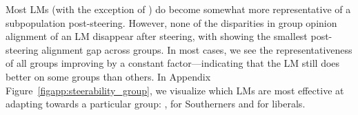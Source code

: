 Most LMs (with the exception of ) do become somewhat more representative of a subpopulation post-steering.
However, none of the disparities in group opinion alignment of an LM disappear after steering, with  showing the smallest post-steering alignment gap across groups. In most cases, we see the representativeness of all groups improving by a constant factor---indicating that the LM still does better on some groups than others.
In Appendix Figure~\ref{figapp:steerability_group}, we visualize which LMs are most effective at adapting towards a particular group: \eg,  for Southerners and  for liberals.

